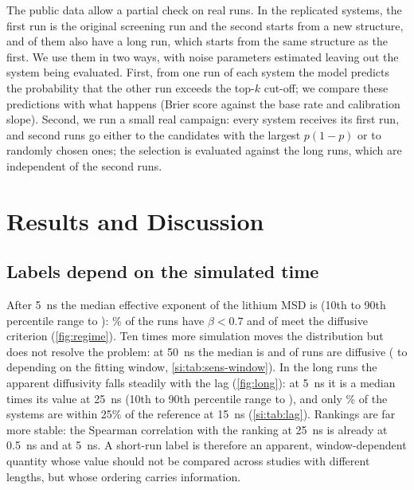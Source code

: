 \documentclass[journal=jcisd8,manuscript=article,email=true]{achemso}
\begin{document}
The public data allow a partial check on real runs. In the replicated systems, the first run is
the original screening run and the second starts from a new structure, and \valAlNCamp{} of them
also have a long run, which starts from the same structure as the first. We use them in two ways,
with noise parameters estimated leaving out the system being evaluated. First, from one run of
each system the model predicts the probability that the other run exceeds the top-$k$ cut-off;
we compare these predictions with what happens (Brier score against the base rate and calibration
slope). Second, we run a small real campaign: every system receives its first run, and
\valAlExtra{} second runs go either to the candidates with the largest $p(1-p)$ or to randomly
chosen ones; the selection is evaluated against the long runs, which are independent of the second
runs.

\section{Results and Discussion}\label{sec:results}
\subsection{Labels depend on the simulated time}\label{sec:res-time}
After \SI{5}{\nano\second} the median effective exponent of the lithium MSD is \betaShortMed{}
(10th to 90th percentile range \betaShortLo{} to \betaShortHi): \betaShortSubPct\% of the runs have $\beta<0.7$ and
\betaShortDiffN{} of \nShort{} meet the diffusive criterion (\cref{fig:regime}). Ten times more
simulation moves the distribution but does not resolve the problem: at \SI{50}{\nano\second} the
median is \betaLongMed{} and \betaLongDiffN{} of \nLong{} runs are diffusive
(\sensLongDiffMinN{} to \sensLongDiffMaxN{} depending on the fitting window, \cref{si:tab:sens-window}).
In the long runs the apparent diffusivity falls steadily with the lag (\cref{fig:long}): at
\SI{5}{\nano\second} it is a median \ratioFive{} times its value at \SI{25}{\nano\second}
(10th to 90th percentile range \ratioFiveLo{} to \ratioFiveHi), and only \withinFifteenPct\% of the systems are
within 25\% of the reference at \SI{15}{\nano\second} (\cref{si:tab:lag}). Rankings are far more
stable: the Spearman correlation with the ranking at \SI{25}{\nano\second} is \rhoHalf{} already at
\SI{0.5}{\nano\second} and \rhoFive{} at \SI{5}{\nano\second}. A short-run label is therefore an
apparent, window-dependent quantity whose value should not be compared across studies with
different lengths, but whose ordering carries information.
\end{document}
